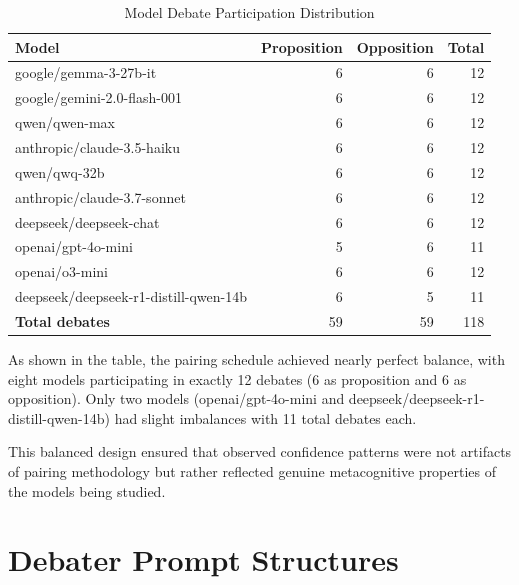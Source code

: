 \documentclass{article}
\begin{document}
\begin{table}[h]
  \caption{Model Debate Participation Distribution}
  \label{tab}
  \centering
  \begin{tabular}{lrrr}
  \toprule
  \textbf{Model} & \textbf{Proposition} & \textbf{Opposition} & \textbf{Total} \\
  \midrule
  google/gemma-3-27b-it & 6 & 6 & 12 \\
  google/gemini-2.0-flash-001 & 6 & 6 & 12 \\
  qwen/qwen-max & 6 & 6 & 12 \\
  anthropic/claude-3.5-haiku & 6 & 6 & 12 \\
  qwen/qwq-32b & 6 & 6 & 12 \\
  anthropic/claude-3.7-sonnet & 6 & 6 & 12 \\
  deepseek/deepseek-chat & 6 & 6 & 12 \\
  openai/gpt-4o-mini & 5 & 6 & 11 \\
  openai/o3-mini & 6 & 6 & 12 \\
  deepseek/deepseek-r1-distill-qwen-14b & 6 & 5 & 11 \\
  \midrule
  \textbf{Total debates} & 59 & 59 & 118 \\
  \bottomrule
  \end{tabular}
\end{table}

As shown in the table, the pairing schedule achieved nearly perfect balance, with eight models participating in exactly 12 debates (6 as proposition and 6 as opposition). Only two models (openai/gpt-4o-mini and deepseek/deepseek-r1-distill-qwen-14b) had slight imbalances with 11 total debates each.

This balanced design ensured that observed confidence patterns were not artifacts of pairing methodology but rather reflected genuine metacognitive properties of the models being studied.






\section{Debater Prompt Structures}
\label{appendix:debater_prompts}
\end{document}
